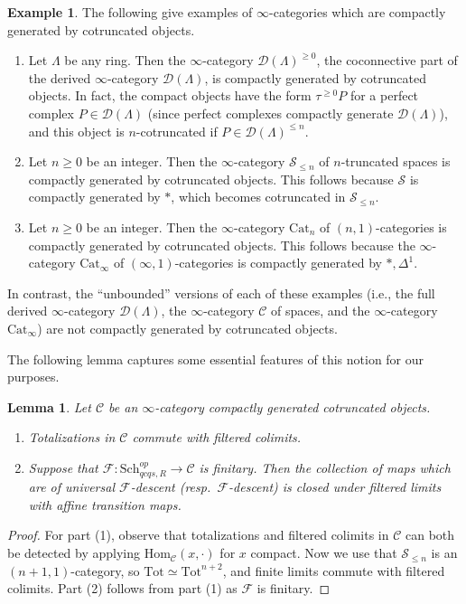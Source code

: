 \documentclass[reqno]{amsart}
\renewcommand{\hom}{\mathrm{Hom}}
\newcommand{\D}{\mathcal{D}}
\newtheorem{lemma}[theorem]{Lemma}
\theoremstyle{definition}
\newtheorem{example}[theorem]{Example}
\begin{document}
\begin{example} 
The following give examples of $\infty$-categories which are compactly generated by cotruncated objects. 
\begin{enumerate}
\item Let $\Lambda$ be any ring. Then the $\infty$-category $\D( \Lambda)^{\geq
0}$, the coconnective part of the derived $\infty$-category $\D( \Lambda)$, is
compactly generated by cotruncated objects. In fact, the compact objects have
the form $\tau^{\geq 0} P$ for a perfect complex $P \in \D(\Lambda)$ (since
perfect complexes compactly generate $\D(\Lambda)$), and this
object is $n$-cotruncated if $P \in \D(\Lambda)^{\leq n}$. 

\item Let $n \geq 0$ be an integer. 
Then the $\infty$-category $\mathcal{S}_{\leq n}$ of $n$-truncated spaces is
compactly generated by cotruncated objects. This follows because $\mathcal{S}$
is compactly generated by $\ast$, which becomes cotruncated in
$\mathcal{S}_{\leq n}$. 
\item 
Let $n \geq 0$ be an integer. 
Then the $\infty$-category $\mathrm{Cat}_{ n}$ of $(n, 1)$-categories is
compactly generated by cotruncated objects. This follows because
the $\infty$-category $\mathrm{Cat}_\infty$ of $(\infty, 1)$-categories is compactly generated by $\ast, \Delta^1$. 
\end{enumerate}
In contrast, the ``unbounded'' versions of each of these examples (i.e., the
full derived $\infty$-category $\mathcal{D}(\Lambda)$, the $\infty$-category
$\mathcal{C}$ of spaces, and the $\infty$-category $\mathrm{Cat}_{\infty}$) are not compactly generated by cotruncated objects. 
\end{example} 

The following lemma captures some essential features of this notion for our purposes.

\begin{lemma}
\label{univFclosedfiltlimit}
Let $\mathcal{C}$ be an $\infty$-category compactly generated cotruncated objects. 
\begin{enumerate}
\item Totalizations in $\mathcal{C}$ commute with filtered colimits. 
\item Suppose that $\mathcal{F}\colon  \mathrm{Sch}_{qcqs,R}^{op} \to
\mathcal{C}$ is finitary. Then the collection of maps which are of universal
$\mathcal{F}$-descent (resp.~$\mathcal{F}$-descent) is closed under filtered limits with affine transition maps. 
\end{enumerate}
\end{lemma}
\begin{proof}
For part (1), observe that totalizations and filtered colimits in $\mathcal{C}$ can both be detected by applying $\hom_{\mathcal{C}}(x, \cdot)$ for $x$ compact.  Now we use that $\mathcal{S}_{\leq n}$ is an $(n+1, 1)$-category, so $\mathrm{Tot} \simeq \mathrm{Tot}^{n+2}$, and finite limits commute with filtered colimits. 
Part (2) follows from part (1) as $\mathcal{F}$ is finitary.
\end{proof}
\end{document}
